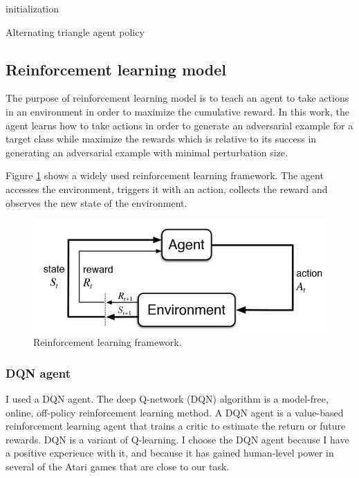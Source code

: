\documentclass{article}
\begin{document}
\begin{algorithm}[H] \label{alg:simple2}
\SetAlgoLined
{}
 initialization\;
 \caption{Alternating triangle agent policy}
\end{algorithm}

\subsection{Reinforcement learning model}
The purpose of reinforcement learning model is to teach an agent to take actions in an environment in order to maximize the cumulative reward. In this work, the agent learns how to take actions in order to generate an adversarial example for a target class while maximize the rewards which is relative to its success in generating an adversarial example with minimal perturbation size.

Figure \ref{fig:rl_model} shows a widely used reinforcement learning framework. The agent accesses the environment, triggers it with an action, collects the reward and observes the new state of the environment.

\begin{figure}[h]
    \centering
        \includegraphics[scale=.8]{reinforcement-learning-fig1-700.jpg}
    \caption{Reinforcement learning framework.}
    \label{fig:rl_model}
\end{figure}


\subsubsection{DQN agent}
I used a DQN agent. The deep Q-network (DQN) algorithm is a model-free, online, off-policy reinforcement learning method. A DQN agent is a value-based reinforcement learning agent that trains a critic to estimate the return or future rewards. DQN is a variant of Q-learning. I choose the DQN agent because I have a positive experience with it, and because it has gained human-level power in several of the Atari games that are close to our task.
\end{document}
